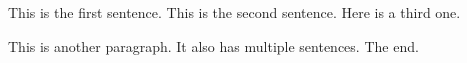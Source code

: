This is the first sentence.
This is the second sentence.
Here is a third one.

This is another paragraph.
It also has multiple sentences.
The end.
